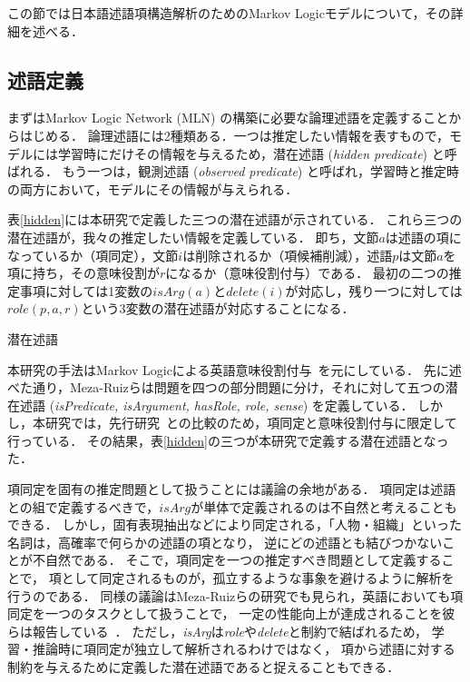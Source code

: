 \documentclass[japanese]{jnlp_1.4}
\begin{document}
この節では日本語述語項構造解析のためのMarkov Logicモデルについて，その詳細を述べる．


\subsection{述語定義}

まずはMarkov Logic Network (MLN) の構築に必要な論理述語を定義することからはじめる．
論理述語には2種類ある．一つは推定したい情報を表すもので，モデルには学習時にだけその情報を与えるため，潜在述語 (\emph{hidden predicate}) と呼ばれる．
もう一つは，観測述語 (\emph{observed predicate}) と呼ばれ，学習時と推定時の両方において，モデルにその情報が与えられる．

表\ref{hidden}には本研究で定義した三つの潜在述語が示されている．
これら三つの潜在述語が，我々の推定したい情報を定義している．
即ち，文節$a$は述語の項になっているか（項同定），文節$i$は削除されるか（項候補削減），述語$p$は文節$a$を項に持ち，その意味役割が$r$になるか（意味役割付与）である．
最初の二つの推定事項に対しては1変数の$\mathit{isArg}(a)$と$\mathit{delete}(i)$が対応し，残り一つに対しては$\mathit{role}(p,a,r)$という3変数の潜在述語が対応することになる．

\begin{table}[b]
\caption{潜在述語}
\label{hidden}

\end{table}

本研究の手法はMarkov Logicによる英語意味役割付与~\cite{meza:2009:naacl}を元にしている．
先に述べた通り，Meza-Ruizらは問題を四つの部分問題に分け，それに対して五つの潜在述語 (\emph{isPredicate, isArgument, hasRole, role, sense}) を定義している．
しかし，本研究では，先行研究~\cite{taira:2008:emnlp,imamura:2009:acl}との比較のため，項同定と意味役割付与に限定して行っている．
その結果，表\ref{hidden}の三つが本研究で定義する潜在述語となった．

項同定を固有の推定問題として扱うことには議論の余地がある．
項同定は述語との組で定義するべきで，$\mathit{isArg}$が単体で定義されるのは不自然と考えることもできる．
しかし，固有表現抽出などにより同定される，「人物・組織」といった名詞は，高確率で何らかの述語の項となり，
逆にどの述語とも結びつかないことが不自然である．
そこで，項同定を一つの推定すべき問題として定義することで，
項として同定されるものが，孤立するような事象を避けるように解析を行うのである．
同様の議論はMeza-Ruizらの研究でも見られ，英語においても項同定を一つのタスクとして扱うことで，
一定の性能向上が達成されることを彼らは報告している~\cite{meza:2009:naacl}．
ただし，\emph{isArg}は\emph{role}や\emph{delete}と制約で結ばれるため，
学習・推論時に項同定が独立して解析されるわけではなく，
項から述語に対する制約を与えるために定義した潜在述語であると捉えることもできる．
\end{document}
